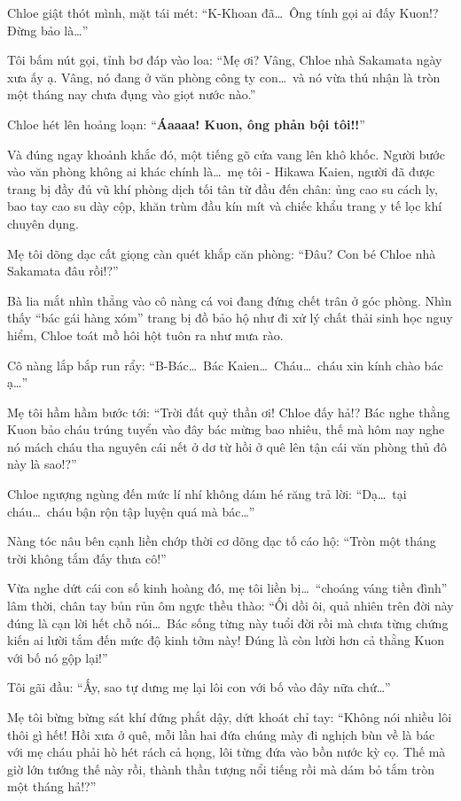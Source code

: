 \documentclass[../main.tex]{subfiles}
\begin{document}
Chloe giật thót mình, mặt tái mét: ``K-Khoan đã\dots\ Ông tính gọi ai đấy Kuon!? Đừng bảo là\dots''

Tôi bấm nút gọi, tỉnh bơ đáp vào loa: ``Mẹ ơi? Vâng, Chloe nhà Sakamata ngày xưa ấy ạ. Vâng, nó đang ở văn phòng công ty con\dots\ và nó vừa thú nhận là tròn một tháng nay chưa đụng vào giọt nước nào.''

Chloe hét lên hoảng loạn: ``\textbf{Áaaaa! Kuon, ông phản bội tôi!!}''

Và đúng ngay khoảnh khắc đó, một tiếng gõ cửa vang lên khô khốc. Người bước vào văn phòng không ai khác chính là\dots\ mẹ tôi - Hikawa Kaien, người đã được trang bị đầy đủ vũ khí phòng dịch tối tân từ đầu đến chân: ủng cao su cách ly, bao tay cao su dày cộp, khăn trùm đầu kín mít và chiếc khẩu trang y tế lọc khí chuyên dụng.

Mẹ tôi dõng dạc cất giọng càn quét khắp căn phòng: ``Đâu? Con bé Chloe nhà Sakamata đâu rồi!?''

Bà lia mắt nhìn thẳng vào cô nàng cá voi đang đứng chết trân ở góc phòng. Nhìn thấy ``bác gái hàng xóm'' trang bị đồ bảo hộ như đi xử lý chất thải sinh học nguy hiểm, Chloe toát mồ hôi hột tuôn ra như mưa rào.

Cô nàng lắp bắp run rẩy: ``B-Bác\dots\ Bác Kaien\dots\ Cháu\dots\ cháu xin kính chào bác ạ\dots''

Mẹ tôi hầm hầm bước tới: ``Trời đất quỷ thần ơi! Chloe đấy hả!? Bác nghe thằng Kuon bảo cháu trúng tuyển vào đây bác mừng bao nhiêu, thế mà hôm nay nghe nó mách cháu tha nguyên cái nết ở dơ từ hồi ở quê lên tận cái văn phòng thủ đô này là sao!?''

Chloe ngượng ngùng đến mức lí nhí không dám hé răng trả lời: ``Dạ\dots\ tại cháu\dots\ cháu bận rộn tập luyện quá mà bác\dots''

Nàng tóc nâu bên cạnh liền chớp thời cơ dõng dạc tố cáo hộ: ``Tròn một tháng trời không tắm đấy thưa cô!''

Vừa nghe dứt cái con số kinh hoàng đó, mẹ tôi liền bị\dots\ ``choáng váng tiền đình'' lâm thời, chân tay bủn rủn ôm ngực thều thào: ``Ối dồi ôi, quả nhiên trên đời này đúng là cạn lời hết chỗ nói\dots\ Bác sống từng này tuổi đời rồi mà chưa từng chứng kiến ai lười tắm đến mức độ kinh tởm này! Đúng là còn lười hơn cả thằng Kuon với bố nó gộp lại!''

Tôi gãi đầu: ``Ấy, sao tự dưng mẹ lại lôi con với bố vào đây nữa chứ\dots''

Mẹ tôi bừng bừng sát khí đứng phắt dậy, dứt khoát chỉ tay: ``Không nói nhiều lôi thôi gì hết! Hồi xưa ở quê, mỗi lần hai đứa chúng mày đi nghịch bùn về là bác với mẹ cháu phải hò hét rách cả họng, lôi từng đứa vào bồn nước kỳ cọ. Thế mà giờ lớn tướng thế này rồi, thành thần tượng nổi tiếng rồi mà dám bỏ tắm tròn một tháng hả!?''
\end{document}
